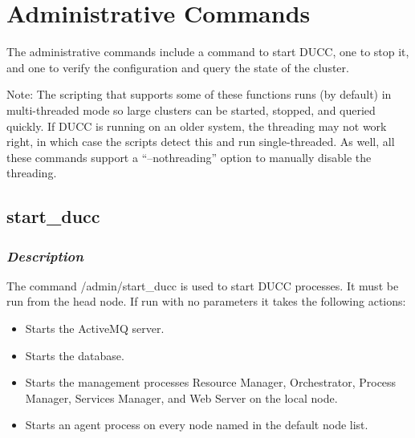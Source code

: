 % 
% 
% 
% 

\section{Administrative Commands}

   The administrative commands include a command to start DUCC, one to stop it, and one to 
   verify the configuration and query the state of the cluster.

   Note: The scripting that supports some of these functions runs (by default) in multi-threaded mode so
   large clusters can be started, stopped, and queried quickly.  If DUCC is running on an older
   system, the threading may not work right, in which case the scripts detect this and run
   single-threaded.  As well, all these commands support a ``--nothreading'' option to manually
   disable the threading.

\subsection{start\_ducc}
\label{subsec:admin.start-ducc}

    \subsubsection{{\em Description}}
    The command \ducchome/admin/start\_ducc is used to start DUCC processes. 
    It must be run from the head node.
    If run with no parameters it takes the following actions:
    \begin{itemize}
      \item Starts the ActiveMQ server.
      \item Starts the database.
      \item Starts the management processes Resource Manager, Orchestrator, Process Manager,      
      Services Manager, and Web Server on the local node.
      \item Starts an agent process on every node named in the default node list. 
    \end{itemize}

